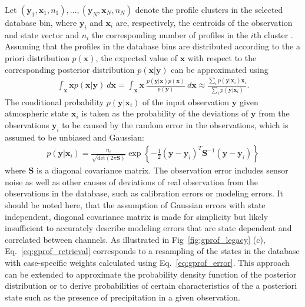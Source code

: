 \documentclass[journal abbreviation, manuscript]{copernicus}
\begin{document}
Let $(\mathbf{y}_1, \mathbf{x}_1, n_1), \ldots, (\mathbf{y}_N, \mathbf{x}_N,
n_N)$ denote the profile clusters in the selected database bin, where
$\mathbf{y}_i$ and $\mathbf{x}_i$ are, respectively, the centroids of the
observation and state vector and $n_i$ the corresponding number of profiles in
the $i$th cluster .
Assuming that the  profiles in the database bins are distributed
according to the a priori distribution $p(\mathbf{x})$, the expected value of
$\mathbf{x}$ with respect to the corresponding posterior distribution
$p(\mathbf{x} | \mathbf{y})$ can be approximated using
\begin{align}\label{eq:gprof_retrieval}
  \int_{\mathbf{x} } \mathbf{x} p(\mathbf{x} | \mathbf{y})\: d\mathbf{x} =
  \int_{\mathbf{x} } \mathbf{x}\: \frac{p(\mathbf{y} |
    \mathbf{x})p(\mathbf{x})}{p(\mathbf{y})}\: d\mathbf{x} \approx \frac{\sum_i
    p(\mathbf{y}|\mathbf{x}_i) \mathbf{x}_i}{\sum_i
    p(\mathbf{y}|\mathbf{x}_i)}.
\end{align}
The conditional probability $p(\mathbf{y} | \mathbf{x}_i)$ of the input
observation $\mathbf{y}$ given atmospheric state $\mathbf{x}_i$ is taken as the
probability of the deviations of $\mathbf{y}$ from the observations
$\mathbf{y}_i$ to be caused by the random error in the observations, which is
assumed to be unbiased and Gaussian:
\begin{align}\label{eq:gprof_error}
  p(\mathbf{y}|\mathbf{x}_i) =
  \frac{n_i}{\sqrt{\text{det}(2\pi\mathbf{S})}} \exp \left \{ - \frac{1}{2}
  (\mathbf{y} - \mathbf{y}_i)^T \mathbf{S}^{-1} (\mathbf{y} - \mathbf{y}_i)
  \right \}
\end{align}
where $\mathbf{S}$ is a diagonal covariance matrix. The observation error
includes sensor noise as well as other causes of deviations of real
observation from the observations in the database, such as calibration errors or
modeling errors. It should be noted here, that the assumption of Gaussian errors
with state independent, diagonal covariance matrix is made for simplicity but
likely insufficient to accurately describe modeling errors that are state
dependent and correlated between channels. As illustrated in
Fig~\ref{fig:gprof_legacy} (c), Eq.~\ref{eq:gprof_retrieval} corresponds to a
resampling of the states in the database with case-specific weights calculated
using Eq.~\ref{eq:gprof_error}. This approach can be extended to approximate the
probability density function of the posterior distribution or to derive
probabilities of certain characteristics of the a posteriori state such as the
presence of precipitation in a given observation.
\end{document}
